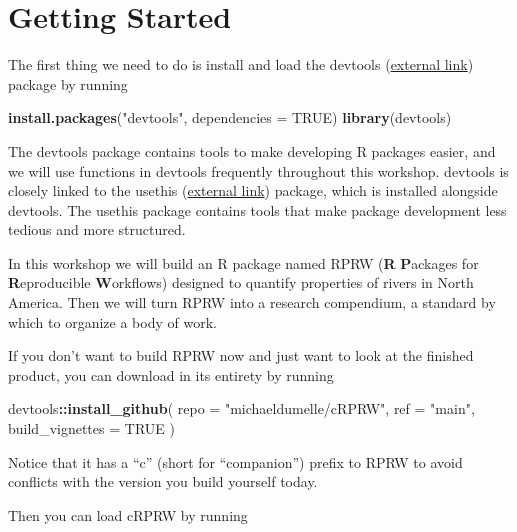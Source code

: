 \documentclass[
]{book}
\newenvironment{Shaded}{\begin{snugshade}}{\end{snugshade}}
\newcommand{\DataTypeTok}[1]{\textcolor[rgb]{0.13,0.29,0.53}{#1}}
\newcommand{\KeywordTok}[1]{\textcolor[rgb]{0.13,0.29,0.53}{\textbf{#1}}}
\newcommand{\NormalTok}[1]{#1}
\newcommand{\OperatorTok}[1]{\textcolor[rgb]{0.81,0.36,0.00}{\textbf{#1}}}
\newcommand{\OtherTok}[1]{\textcolor[rgb]{0.56,0.35,0.01}{#1}}
\newcommand{\StringTok}[1]{\textcolor[rgb]{0.31,0.60,0.02}{#1}}
\begin{document}
\hypertarget{getting-started}{%
\section*{Getting Started}\label{getting-started}}

The first thing we need to do is install and load the devtools (\href{https://devtools.r-lib.org/}{external link}) package by running

\begin{Shaded}
\begin{Highlighting}[]
\KeywordTok{install.packages}\NormalTok{(}\StringTok{"devtools"}\NormalTok{, }\DataTypeTok{dependencies =} \OtherTok{TRUE}\NormalTok{)}
\KeywordTok{library}\NormalTok{(devtools)}
\end{Highlighting}
\end{Shaded}

The devtools package contains tools to make developing R packages easier, and we will use functions in devtools frequently throughout this workshop. devtools is closely linked to the usethis (\href{https://usethis.r-lib.org/}{external link}) package, which is installed alongside devtools. The usethis package contains tools that make package development less tedious and more structured.

In this workshop we will build an R package named RPRW (\textbf{R} \textbf{P}ackages for \textbf{R}eproducible \textbf{W}orkflows) designed to quantify properties of rivers in North America. Then we will turn RPRW into a research compendium, a standard by which to organize a body of work.

If you don't want to build RPRW now and just want to look at the finished product, you can download in its entirety by running

\begin{Shaded}
\begin{Highlighting}[]
\NormalTok{devtools}\OperatorTok{::}\KeywordTok{install_github}\NormalTok{(}
  \DataTypeTok{repo =} \StringTok{"michaeldumelle/cRPRW"}\NormalTok{,}
  \DataTypeTok{ref =} \StringTok{"main"}\NormalTok{,}
  \DataTypeTok{build_vignettes =} \OtherTok{TRUE}
\NormalTok{)}
\end{Highlighting}
\end{Shaded}

Notice that it has a ``c'' (short for ``companion'') prefix to RPRW to avoid conflicts with the version you build yourself today.

Then you can load cRPRW by running
\end{document}
